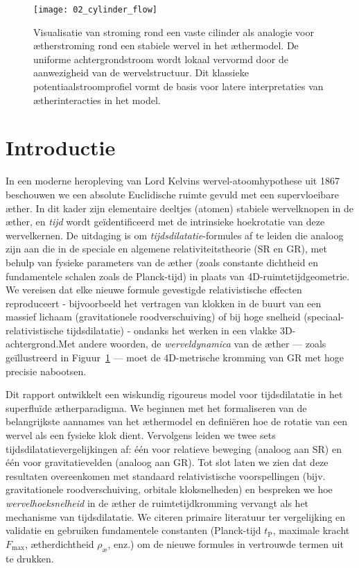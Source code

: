 \begin{figure}[htbp]
    \centering
    \texttt{[image: 02\_cylinder\_flow]}
    \caption{Visualisatie van stroming rond een vaste cilinder als analogie voor ætherstroming rond een stabiele wervel in het æthermodel. De uniforme achtergrondstroom wordt lokaal vervormd door de aanwezigheid van de wervelstructuur. Dit klassieke potentiaalstroomprofiel vormt de basis voor latere interpretaties van ætherinteracties in het model.}
    \label{fig:cylinderflow}
\end{figure}

\section{Introductie}
In een moderne heropleving van Lord Kelvins wervel-atoomhypothese uit 1867~\cite{Kelvin1867-vortex} beschouwen we een absolute Euclidische ruimte gevuld met een supervloeibare æther. In dit kader zijn elementaire deeltjes (atomen) stabiele wervelknopen in de æther, en \emph{tijd} wordt geïdentificeerd met de intrinsieke hoekrotatie van deze wervelkernen. De uitdaging is om \emph{tijdsdilatatie}-formules af te leiden die analoog zijn aan die in de speciale en algemene relativiteitstheorie (SR en GR), met behulp van fysieke parameters van de æther (zoals constante dichtheid en fundamentele schalen zoals de Planck-tijd) in plaats van 4D-ruimtetijdgeometrie. We vereisen dat elke nieuwe formule gevestigde relativistische effecten reproduceert - bijvoorbeeld het vertragen van klokken in de buurt van een massief lichaam (gravitationele roodverschuiving) of bij hoge snelheid (speciaal-relativistische tijdsdilatatie) - ondanks het werken in een vlakke 3D-achtergrond.Met andere woorden, de \emph{werveldynamica} van de æther — zoals geïllustreerd in Figuur~\ref{fig:cylinderflow} — moet de 4D-metrische kromming van GR met hoge precisie nabootsen.


Dit rapport ontwikkelt een wiskundig rigoureus model voor tijdsdilatatie in het superfluïde ætherparadigma. We beginnen met het formaliseren van
de belangrijkste aannames van het æthermodel en definiëren hoe de rotatie van een wervel als een fysieke klok dient. Vervolgens leiden we twee
sets tijdsdilatatievergelijkingen af: één voor relatieve beweging (analoog aan SR) en één voor gravitatievelden (analoog aan GR). Tot slot laten we zien dat deze resultaten overeenkomen met standaard relativistische voorspellingen (bijv. gravitationele roodverschuiving, orbitale kloksnelheden) en bespreken we hoe \emph{wervelhoeksnelheid} in de æther de ruimtetijdkromming vervangt als het mechanisme van tijdsdilatatie. We citeren primaire literatuur ter vergelijking en validatie en gebruiken fundamentele constanten (Planck-tijd $t_\textrm{P}$, maximale kracht $F_{\max}$, ætherdichtheid $\rho_{\text{\ae}}$, enz.) om de nieuwe formules in vertrouwde termen uit te drukken.